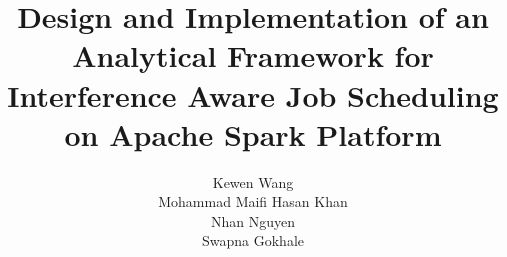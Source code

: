 \documentclass[twocolumn]{svjour3}
\begin{document}
\title{Design and Implementation of an Analytical Framework for Interference Aware Job Scheduling on Apache Spark Platform}




\author{Kewen Wang \\
Mohammad Maifi Hasan Khan \\ Nhan Nguyen \\ Swapna Gokhale}












\maketitle
\end{document}
